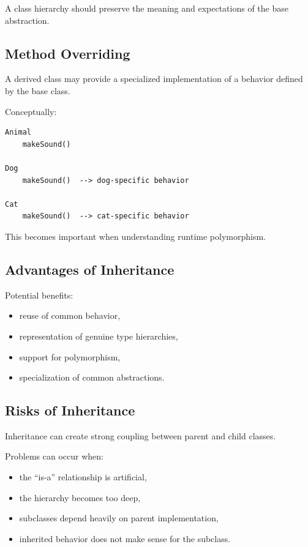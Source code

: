 \documentclass[11pt,a4paper]{article}
\begin{document}
A class hierarchy should preserve the meaning and expectations of the
base abstraction.

\subsection{Method Overriding}

A derived class may provide a specialized implementation of a behavior
defined by the base class.

Conceptually:

\begin{verbatim}
Animal
    makeSound()

Dog
    makeSound()  --> dog-specific behavior

Cat
    makeSound()  --> cat-specific behavior
\end{verbatim}

This becomes important when understanding runtime polymorphism.

\subsection{Advantages of Inheritance}

Potential benefits:

\begin{itemize}
    \item reuse of common behavior,
    \item representation of genuine type hierarchies,
    \item support for polymorphism,
    \item specialization of common abstractions.
\end{itemize}

\subsection{Risks of Inheritance}

Inheritance can create strong coupling between parent and child classes.

Problems can occur when:

\begin{itemize}
    \item the ``is-a'' relationship is artificial,
    \item the hierarchy becomes too deep,
    \item subclasses depend heavily on parent implementation,
    \item inherited behavior does not make sense for the subclass.
\end{itemize}
\end{document}
